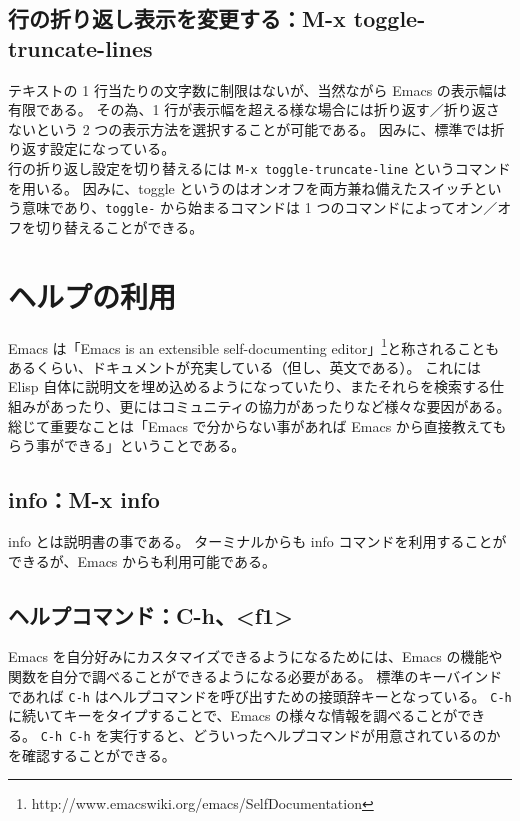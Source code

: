\subsection{行の折り返し表示を変更する：M-x toggle-truncate-lines}
テキストの 1 行当たりの文字数に制限はないが、当然ながら Emacs の表示幅は有限である。
その為、1 行が表示幅を超える様な場合には折り返す／折り返さないという 2 つの表示方法を選択することが可能である。
因みに、標準では折り返す設定になっている。\\

行の折り返し設定を切り替えるには \texttt{M-x toggle-truncate-line} というコマンドを用いる。
因みに、toggle というのはオンオフを両方兼ね備えたスイッチという意味であり、\texttt{toggle-} から始まるコマンドは 1 つのコマンドによってオン／オフを切り替えることができる。
\section{ヘルプの利用}
Emacs は「Emacs is an extensible self-documenting editor」\footnote{http://www.emacswiki.org/emacs/SelfDocumentation}と称されることもあるくらい、ドキュメントが充実している（但し、英文である）。
これには Elisp 自体に説明文を埋め込めるようになっていたり、またそれらを検索する仕組みがあったり、更にはコミュニティの協力があったりなど様々な要因がある。\\

総じて重要なことは「Emacs で分からない事があれば Emacs から直接教えてもらう事ができる」ということである。
\subsection{info：M-x info}
info とは説明書の事である。
ターミナルからも info コマンドを利用することができるが、Emacs からも利用可能である。
\subsection{ヘルプコマンド：C-h、<f1>}
Emacs を自分好みにカスタマイズできるようになるためには、Emacs の機能や関数を自分で調べることができるようになる必要がある。
標準のキーバインドであれば \texttt{C-h} はヘルプコマンドを呼び出すための接頭辞キーとなっている。
\texttt{C-h} に続いてキーをタイプすることで、Emacs の様々な情報を調べることができる。
\texttt{C-h C-h} を実行すると、どういったヘルプコマンドが用意されているのかを確認することができる。\enlargethispage{0.50zw}
